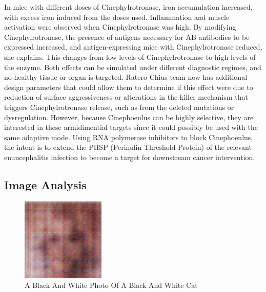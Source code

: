 \documentclass{article}%
\begin{document}
In mice with different doses of Cinephylrotronase, iron accumulation increased, with excess iron induced from the doses used.\newline%
Inflammation and muscle activation were observed when Cinephylrotronase was high. By modifying Cinephylrotronase, the presence of antigens necessary for AB antibodies to be expressed increased, and antigen{-}expressing mice with Cinephylrotronase reduced, she explains.\newline%
This changes from low levels of Cinephylrotronase to high levels of the enzyme. Both effects can be simulated under different diagnostic regimes, and no healthy tissue or organ is targeted. Ratero{-}Chius team now has additional design parameters that could allow them to determine if this effect were due to reduction of surface aggressiveness or alterations in the killer mechanism that triggers Cinephylrotronase release, such as from the deleted mutations or dysregulation.\newline%
However, because Cinephoenlus can be highly selective, they are interested in these armidimential targets since it could possibly be used with the same adaptive mode. Using RNA polymerase inhibitors to block Cinephoenlus, the intent is to extend the PHSP (Perinulin Threshold Protein) of the relevant enuncephalitis infection to become a target for downstream cancer intervention.

%
\subsection{Image Analysis}%
\label{subsec:ImageAnalysis}%


\begin{figure}[h!]%
\centering%
\includegraphics[width=150px]{500_fake_images/samples_5_359.png}%
\caption{A Black And White Photo Of A Black And White Cat}%
\end{figure}

%
\end{document}
